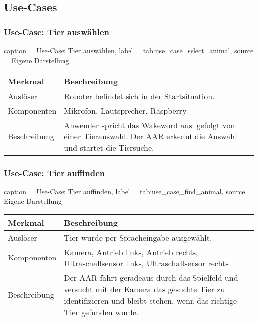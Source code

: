 \subsection{Use-Cases}

\subsubsection{Use-Case: Tier auswählen}

\begin{dhbwtable}{%
    caption	= Use-Case: Tier auswählen,
    label	= tab:use_case_select_animal,
    source	= Eigene Darstellung
}
    \begin{tabular}{ll}
        \toprule
        \textbf{Merkmal}     & \textbf{Beschreibung}  \\\midrule
        Auslöser     & Roboter befindet sich in der Startsituation.\\
        Komponenten  & Mikrofon, Lautsprecher, Raspberry\\
        Beschreibung & Anwender spricht das Wakeword aus, gefolgt von einer Tierauswahl. Der \ac{AAR} erkennt die Auswahl und startet die Tiersuche.\\\bottomrule
    \end{tabular}    
\end{dhbwtable}

\subsubsection{Use-Case: Tier auffinden}

\begin{dhbwtable}{%
    caption	= Use-Case: Tier auffinden,
    label	= tab:use_case_find_animal,
    source	= Eigene Darstellung
}
    \begin{tabular}{ll}
        \toprule
        \textbf{Merkmal}     & \textbf{Beschreibung}  \\\midrule
        Auslöser     & Tier wurde per Spracheingabe ausgewählt.\\
        Komponenten  & Kamera, Antrieb links, Antrieb rechts, Ultraschallsensor links, Ultraschallsensor rechts\\
        Beschreibung & Der \ac{AAR} fährt geradeaus durch das Spielfeld und versucht mit der Kamera das gesuchte Tier zu identifizieren und bleibt stehen, wenn das richtige Tier gefunden wurde.\\\bottomrule
    \end{tabular}    
\end{dhbwtable}

